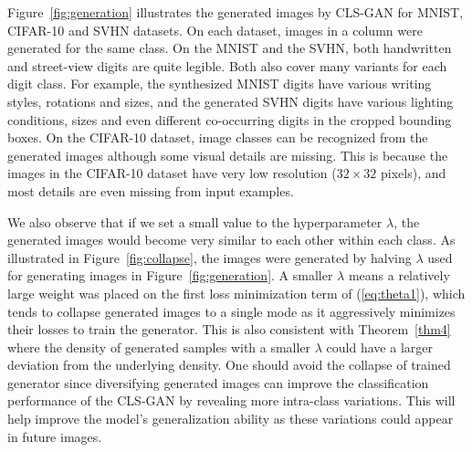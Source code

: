 \documentclass[11pt,fullpage, letterpaper,twoside]{article}
\newcommand{\1}[1]{\mathds{1}_{\left[#1\right]}}
\begin{document}
Figure~\ref{fig:generation} illustrates the generated images by CLS-GAN for MNIST, CIFAR-10 and SVHN datasets. On each dataset, images in a column were generated for the same class. On the MNIST and the SVHN, both handwritten and street-view digits are quite legible. Both also cover many variants for each digit class. For example, the synthesized MNIST digits have various writing styles, rotations and sizes, and the generated SVHN digits have various lighting conditions, sizes and even different co-occurring digits in the cropped bounding boxes.  On the CIFAR-10 dataset, image classes can be recognized from the generated images although some visual details are missing. This is because the images in the CIFAR-10 dataset have very low resolution ($32\times 32$ pixels), and most details are even missing from input examples.

We also observe that if we set a small value to the hyperparameter $\lambda$, the generated images would become very similar to each other within each class. As illustrated in Figure~\ref{fig:collapse}, the images were generated by halving $\lambda$ used for generating images in Figure~\ref{fig:generation}.
A smaller $\lambda$ means a relatively large weight was placed on the first loss minimization term of (\ref{eq:theta1}), which tends to collapse generated images to a single mode as it aggressively minimizes their losses to train the generator. This is also consistent with Theorem~\ref{thm4} where the density of generated samples with a smaller $\lambda$ could have a larger deviation from the underlying density.
One should avoid the collapse of trained generator since
diversifying generated images can improve the classification performance of the CLS-GAN by revealing more intra-class variations.  This will help improve the model's generalization ability as these variations could appear in future images.


\begin{figure*}[t]
\centering
{}\hspace{4mm}
\hspace{4mm}
\caption{Illustration of generated images that are collapsed to a single mode of the underlying image density on MNIST, CIFAR-10 and SVHN.}\label{fig:collapse}
\end{figure*}
\end{document}
